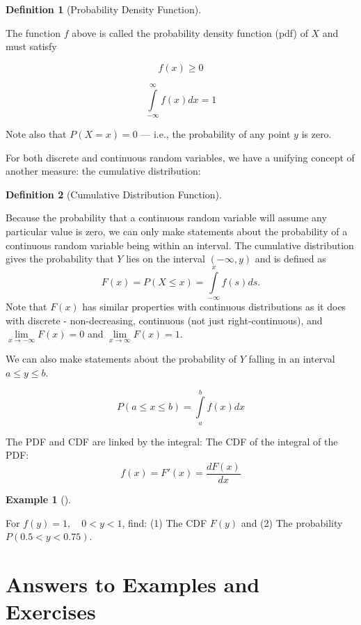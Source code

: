 \documentclass[
  letterpaper,
]{book}
\theoremstyle{definition}
\newtheorem{definition}{Definition}[chapter]
\theoremstyle{definition}
\newtheorem{example}{Example}[chapter]
\theoremstyle{plain}
\theoremstyle{definition}
\theoremstyle{plain}
\theoremstyle{plain}
\theoremstyle{remark}
\begin{document}
\leavevmode{}%
\begin{definition}[Probability Density Function]\label{def-}

The function \(f\) above is called the probability density function
(pdf) of \(X\) and must satisfy

\[f(x)\ge 0\]

\[\int\limits_{-\infty}^\infty f(x)dx=1\]

Note also that \(P(X = x)=0\) --- i.e., the probability of any point
\(y\) is zero.

\end{definition}

For both discrete and continuous random variables, we have a unifying
concept of another measure: the cumulative distribution:

\leavevmode{}%
\begin{definition}[Cumulative Distribution Function]\label{def-}

Because the probability that a continuous random variable will assume
any particular value is zero, we can only make statements about the
probability of a continuous random variable being within an interval.
The cumulative distribution gives the probability that \(Y\) lies on the
interval \((-\infty,y)\) and is defined as
\[F(x)=P(X\le x)=\int\limits_{-\infty}^x f(s)ds.\] Note that \(F(x)\)
has similar properties with continuous distributions as it does with
discrete - non-decreasing, continuous (not just right-continuous), and
\(\lim\limits_{x \to -\infty} F(x) = 0\) and
\(\lim\limits_{x \to \infty} F(x) = 1\).

\end{definition}

We can also make statements about the probability of \(Y\) falling in an
interval \(a\le y\le b\).

\[P(a\le x\le b)=\int\limits_a^b f(x)dx\]

The PDF and CDF are linked by the integral: The CDF of the integral of
the PDF: \[f(x) = F'(x)=\frac{dF(x)}{dx}\]

\leavevmode{}%
\begin{example}[]\label{exm-}

For \(f(y)=1, \quad 0<y<1\), find: (1) The CDF \(F(y)\) and (2) The
probability \(P(0.5<y<0.75)\).

\end{example}

\hypertarget{answers-to-examples-and-exercises-3}{%
\section*{Answers to Examples and
Exercises}\label{answers-to-examples-and-exercises-3}}
\end{document}
